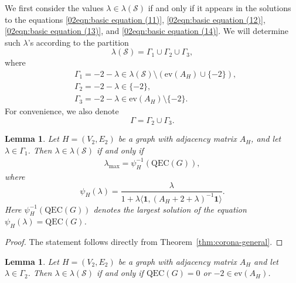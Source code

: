 \documentclass[pdflatex,sn-mathphys-num]{sn-jnl}
\theoremstyle{thmstyleone}%
\newtheorem{lemma}[theorem]{Lemma}%
\theoremstyle{thmstyletwo}%
\theoremstyle{thmstylethree}%
\begin{document}
We first consider the values $\lambda\in \lambda(\mathcal{S})$ if and only if it appears in the solutions to the equations \eqref{02eqn:basic equation (11)}, \eqref{02eqn:basic equation (12)}, \eqref{02eqn:basic equation (13)}, and \eqref{02eqn:basic equation (14)}. 
We will determine such $\lambda$'s according to the partition
\[
\lambda(\mathcal{S})=\Gamma_1\cup \Gamma_2\cup \Gamma_3,
\]
where
\begin{align}
&\Gamma_1=-2-\lambda\in \lambda(\mathcal{S})\setminus (\mathrm{ev}(A_H)\cup \{-2\}),\\
&\Gamma_2=-2-\lambda\in \{-2\},\\
&\Gamma_3=-2-\lambda\in \mathrm{ev}(A_H)\setminus \{-2\}.
\end{align}
For convenience, we also denote
\[
\Gamma=\Gamma_2\cup \Gamma_3 .
\]

\begin{lemma}\label{lemma:Gamma1}
Let $H=(V_2,E_2)$ be a graph with adjacency matrix $A_H$, and let $\lambda\in \Gamma_1$. 
Then $\lambda\in \lambda(\mathcal{S})$ if and only if
\begin{align}\label{eq:Gamma1}
\lambda_{\max}=\psi_H^{-1}(\mathrm{QEC}(G)),
\end{align}
where
\[
\psi_H(\lambda)
=
\frac{\lambda}{
1+\lambda \langle \mathbf{1}, (A_H+2+\lambda)^{-1}\mathbf{1}\rangle}.
\]
Here $\psi_H^{-1}(\mathrm{QEC}(G))$ denotes the largest solution of the equation
$\psi_H(\lambda)=\mathrm{QEC}(G)$.
\end{lemma}

\begin{proof}
The statement follows directly from Theorem~\ref{thm:corona-general}.
\end{proof}

\begin{lemma}\label{lemma 2: Gamma_2}
Let $H=(V_2,E_2)$ be a graph with adjacency matrix $A_H$ and let 
$\lambda\in \Gamma_2$. Then $\lambda\in \lambda(\mathcal S)$
if and only if $\mathrm{QEC}(G)=0$ or $-2\in \mathrm{ev}(A_H)$.
\end{lemma}
\end{document}
